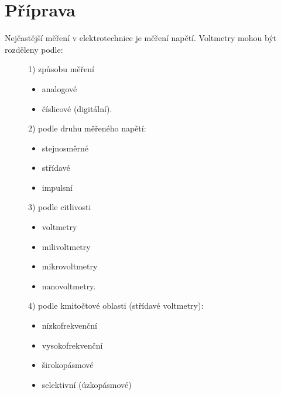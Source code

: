 \documentclass{article}
\begin{document}
\section*{Příprava}
Nejčastější měření v elektrotechnice je měření napětí.
Voltmetry mohou být rozděleny podle:

\begin{figure}[H]
    \scriptsize
    {
        \begin{minipage}[t]{0.24\textwidth}
            1) způsobu měření
            \begin{itemize}
                \item analogové
                \item číslicové (digitální).
            \end{itemize}
        \end{minipage}
        \hfill
        \begin{minipage}[t]{0.24\textwidth}
            2) podle druhu měřeného napětí: 
            \begin{itemize}
                \item stejnosměrné 
                \item střídavé
                \item impulsní
            \end{itemize}
        \end{minipage}
        \hfill
        \begin{minipage}[t]{0.24\textwidth}
            3) podle citlivosti
            \begin{itemize}
                \item voltmetry
                \item milivoltmetry
                \item mikrovoltmetry
                \item nanovoltmetry.
            \end{itemize}
        \end{minipage}
        \hfill
        \begin{minipage}[t]{0.24\textwidth}
            4) podle kmitočtové oblasti (střídavé voltmetry):
            \begin{itemize}
                \item nízkofrekvenční
                \item vysokofrekvenční
                \item širokopásmové
                \item selektivní (úzkopásmové)
            \end{itemize}
        \end{minipage}
    }
\end{figure}
\end{document}
